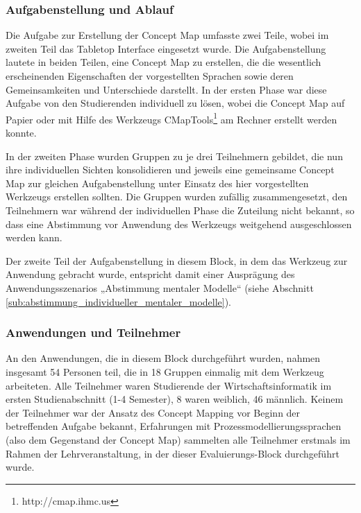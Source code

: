 
\subsubsection{Aufgabenstellung und Ablauf} %
\label{ssub:3_aufgabenstellung}

Die Aufgabe zur Erstellung der Concept Map umfasste zwei Teile, wobei im zweiten Teil das Tabletop Interface eingesetzt wurde. Die Aufgabenstellung lautete in beiden Teilen, eine Concept Map zu erstellen, die die wesentlich erscheinenden Eigenschaften der vorgestellten Sprachen sowie deren Gemeinsamkeiten und Unterschiede darstellt. In der ersten Phase war diese Aufgabe von den Studierenden individuell zu lösen, wobei die Concept Map auf Papier oder mit Hilfe des Werkzeugs CMapTools\footnote{http://cmap.ihmc.us} \citep{Canas04} am Rechner erstellt werden konnte. 

In der zweiten Phase wurden Gruppen zu je drei Teilnehmern gebildet, die nun ihre individuellen Sichten konsolidieren und jeweils eine gemeinsame Concept Map zur gleichen Aufgabenstellung unter Einsatz des hier vorgestellten Werkzeugs erstellen sollten. Die Gruppen wurden zufällig zusammengesetzt, den Teilnehmern war während der individuellen Phase die Zuteilung nicht bekannt, so dass eine Abstimmung vor Anwendung des Werkzeugs weitgehend ausgeschlossen werden kann.

Der zweite Teil der Aufgabenstellung in diesem Block, in dem das Werkzeug zur Anwendung gebracht wurde, entspricht damit einer Ausprägung des Anwendungsszenarios „Abstimmung mentaler Modelle“ (siehe Abschnitt \ref{sub:abstimmung_individueller_mentaler_modelle}).


\subsubsection{Anwendungen und Teilnehmer} %
\label{ssub:3_teilnehmer}

An den Anwendungen, die in diesem Block durchgeführt wurden, nahmen insgesamt 54 Personen teil, die in 18 Gruppen einmalig mit dem Werkzeug arbeiteten. Alle Teilnehmer waren Studierende der Wirtschaftsinformatik im ersten Studienabschnitt (1-4 Semester), 8 waren weiblich, 46 männlich. Keinem der Teilnehmer war der Ansatz des Concept Mapping vor Beginn der betreffenden Aufgabe bekannt, Erfahrungen mit Prozessmodellierungssprachen (also dem Gegenstand der Concept Map) sammelten alle Teilnehmer erstmals im Rahmen der Lehrveranstaltung, in der dieser Evaluierungs-Block durchgeführt wurde.

